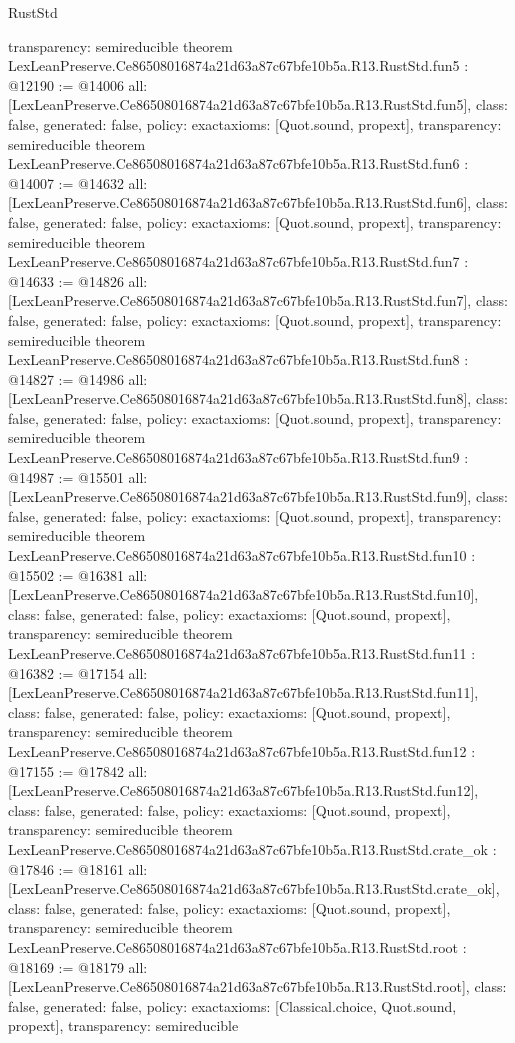 \begin{lexlean}{RustStd}
\begin{coremodule}
{  transparency: semireducible
}
theorem LexLeanPreserve.Ce86508016874a21d63a87c67bfe10b5a.R13.RustStd.fun5 : @12190 := @14006 {
  all: [LexLeanPreserve.Ce86508016874a21d63a87c67bfe10b5a.R13.RustStd.fun5],
  class: false,
  generated: false,
  policy: exact{axioms: [Quot.sound, propext]},
  transparency: semireducible
}
theorem LexLeanPreserve.Ce86508016874a21d63a87c67bfe10b5a.R13.RustStd.fun6 : @14007 := @14632 {
  all: [LexLeanPreserve.Ce86508016874a21d63a87c67bfe10b5a.R13.RustStd.fun6],
  class: false,
  generated: false,
  policy: exact{axioms: [Quot.sound, propext]},
  transparency: semireducible
}
theorem LexLeanPreserve.Ce86508016874a21d63a87c67bfe10b5a.R13.RustStd.fun7 : @14633 := @14826 {
  all: [LexLeanPreserve.Ce86508016874a21d63a87c67bfe10b5a.R13.RustStd.fun7],
  class: false,
  generated: false,
  policy: exact{axioms: [Quot.sound, propext]},
  transparency: semireducible
}
theorem LexLeanPreserve.Ce86508016874a21d63a87c67bfe10b5a.R13.RustStd.fun8 : @14827 := @14986 {
  all: [LexLeanPreserve.Ce86508016874a21d63a87c67bfe10b5a.R13.RustStd.fun8],
  class: false,
  generated: false,
  policy: exact{axioms: [Quot.sound, propext]},
  transparency: semireducible
}
theorem LexLeanPreserve.Ce86508016874a21d63a87c67bfe10b5a.R13.RustStd.fun9 : @14987 := @15501 {
  all: [LexLeanPreserve.Ce86508016874a21d63a87c67bfe10b5a.R13.RustStd.fun9],
  class: false,
  generated: false,
  policy: exact{axioms: [Quot.sound, propext]},
  transparency: semireducible
}
theorem LexLeanPreserve.Ce86508016874a21d63a87c67bfe10b5a.R13.RustStd.fun10 : @15502 := @16381 {
  all: [LexLeanPreserve.Ce86508016874a21d63a87c67bfe10b5a.R13.RustStd.fun10],
  class: false,
  generated: false,
  policy: exact{axioms: [Quot.sound, propext]},
  transparency: semireducible
}
theorem LexLeanPreserve.Ce86508016874a21d63a87c67bfe10b5a.R13.RustStd.fun11 : @16382 := @17154 {
  all: [LexLeanPreserve.Ce86508016874a21d63a87c67bfe10b5a.R13.RustStd.fun11],
  class: false,
  generated: false,
  policy: exact{axioms: [Quot.sound, propext]},
  transparency: semireducible
}
theorem LexLeanPreserve.Ce86508016874a21d63a87c67bfe10b5a.R13.RustStd.fun12 : @17155 := @17842 {
  all: [LexLeanPreserve.Ce86508016874a21d63a87c67bfe10b5a.R13.RustStd.fun12],
  class: false,
  generated: false,
  policy: exact{axioms: [Quot.sound, propext]},
  transparency: semireducible
}
theorem LexLeanPreserve.Ce86508016874a21d63a87c67bfe10b5a.R13.RustStd.crate_ok : @17846 := @18161 {
  all: [LexLeanPreserve.Ce86508016874a21d63a87c67bfe10b5a.R13.RustStd.crate_ok],
  class: false,
  generated: false,
  policy: exact{axioms: [Quot.sound, propext]},
  transparency: semireducible
}
theorem LexLeanPreserve.Ce86508016874a21d63a87c67bfe10b5a.R13.RustStd.root : @18169 := @18179 {
  all: [LexLeanPreserve.Ce86508016874a21d63a87c67bfe10b5a.R13.RustStd.root],
  class: false,
  generated: false,
  policy: exact{axioms: [Classical.choice, Quot.sound, propext]},
  transparency: semireducible
}


\end{coremodule}
\end{lexlean}
